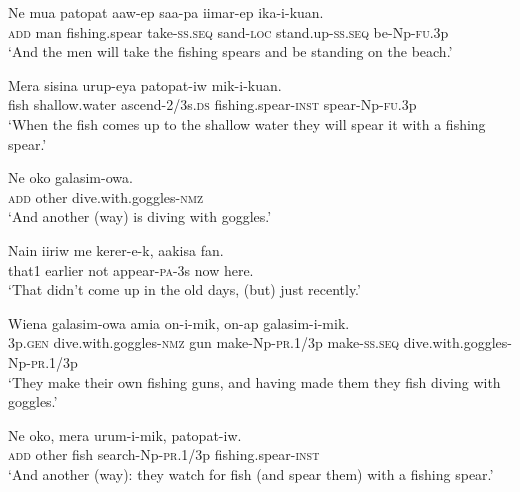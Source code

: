{\ea\label{ex:a:x29}
\gll  Ne  mua  patopat  aaw-ep  saa-pa  iimar-ep                  ika-i-kuan. \\
\textsc{add}  man  fishing.spear  take-\textsc{ss.seq}  sand-\textsc{loc}  stand.up-\textsc{ss.seq}   be-Np-\textsc{fu}.3p \\


\glt ‘And the men will take the fishing spears and be standing on the beach.’ \\
\z


\ea\label{ex:a:x30}
\gll  Mera  sisina  urup-eya  patopat-iw                 mik-i-kuan. \\
fish  shallow.water  ascend-2/3s.\textsc{ds}  fishing.spear-\textsc{inst}  spear-Np-\textsc{fu}.3p \\


\glt ‘When the fish comes up to the shallow water they will spear it with a fishing spear.’ \\
\z


\ea\label{ex:a:x31}
\gll  Ne  oko  galasim-owa. \\
\textsc{add}  other  dive.with.goggles-\textsc{nmz} \\
\glt ‘And another (way) is diving with goggles.’ \\
\z


\ea\label{ex:a:x32}
\gll  Nain  iiriw  me  kerer-e-k,  aakisa  fan. \\
that1  earlier  not  appear-\textsc{pa}-3s  now  here. \\
\glt ‘That didn’t come up in the old days, (but) just recently.’ \\
\z


\ea\label{ex:a:x33}
\gll  Wiena  galasim-owa  amia  on-i-mik,           on-ap  galasim-i-mik. \\
3p.\textsc{gen}  dive.with.goggles-\textsc{nmz}  gun  make-Np-\textsc{pr}.1/3p make-\textsc{ss.seq}  dive.with.goggles-Np-\textsc{pr}.1/3p \\


\glt ‘They make their own fishing guns, and having made them they fish diving with goggles.’ \\
\z


\ea\label{ex:a:x34}
\gll  Ne  oko,  mera  urum-i-mik,  patopat-iw. \\
\textsc{add}  other  fish  search-Np-\textsc{pr}.1/3p  fishing.spear-\textsc{inst} \\
\glt ‘And another (way): they watch for fish (and spear them) with a fishing spear.’ \\
\z


}
